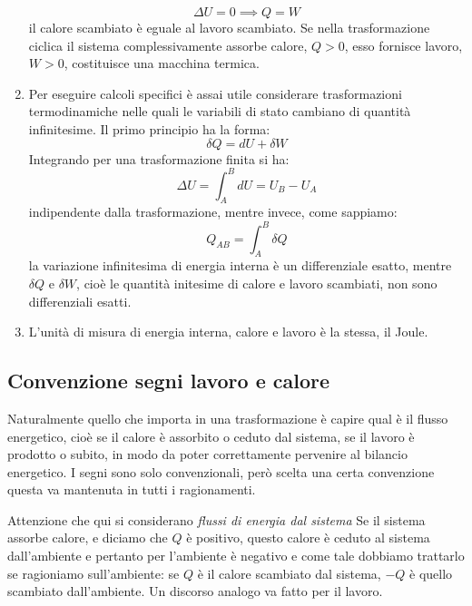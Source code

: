 \documentclass[class=book, crop=false, oneside, 12pt]{standalone}
\begin{document}
\begin{enumerate}
    \begin{equation}
        \Delta U = 0 \implies Q = W
    \end{equation}
    il calore scambiato è eguale al lavoro scambiato. 
    Se nella trasformazione ciclica il sistema complessivamente assorbe calore, \(Q > 0\), esso fornisce lavoro, \(W > 0\), costituisce una macchina termica. 
    \item Per eseguire calcoli specifici è assai utile considerare trasformazioni termodinamiche nelle quali le variabili di stato cambiano di quantità infinitesime.
    Il primo principio ha la forma:
    \begin{equation*}
        \delta Q = d U + \delta W
    \end{equation*}
    Integrando per una trasformazione finita si ha:
    \begin{equation*}
        \Delta U = \int_A^B d U = U_B - U_A
    \end{equation*}
    indipendente dalla trasformazione, mentre invece, come sappiamo:
    \begin{equation*}
        Q_{AB} = \int_A^B \delta Q
    \end{equation*}
    la variazione infinitesima di energia interna è un differenziale esatto, mentre \(\delta Q \) e \(\delta W\), cioè le quantità initesime di calore e lavoro scambiati, non sono differenziali esatti.
    \item L'unità di misura di energia interna, calore e lavoro è la stessa, il Joule.
\end{enumerate}

\subsection{Convenzione segni lavoro e calore}


Naturalmente quello che importa in una trasformazione è capire qual è il flusso energetico, cioè se il calore è assorbito o ceduto dal sistema, se il lavoro è prodotto o subito, in modo da poter correttamente pervenire al bilancio energetico. 
I segni sono solo convenzionali, però scelta una certa convenzione questa va mantenuta in tutti i ragionamenti.

Attenzione che qui si considerano \emph{flussi di energia dal sistema}
Se il sistema assorbe calore, e diciamo che \(Q\) è positivo, questo calore è ceduto al sistema dall'ambiente e pertanto per l'ambiente è negativo e come tale dobbiamo trattarlo se ragioniamo sull'ambiente: se \(Q\) è il calore scambiato dal sistema, \(-Q\) è  quello scambiato dall'ambiente. 
Un discorso analogo va fatto per il lavoro.
\end{document}
